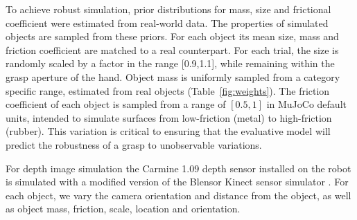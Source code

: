 To achieve robust simulation, prior distributions for mass, size and frictional coefficient were estimated from real-world data. The properties of simulated objects are sampled from these priors. For each object its mean size, mass and friction coefficient are matched to a real counterpart. For each trial, the size is randomly scaled by a factor in the range [0.9,1.1], while remaining within the grasp aperture of the hand. Object mass is uniformly sampled from a category specific range, estimated from real objects (Table~\ref{fig:weights}). The friction coefficient of each object is sampled from a range of $[0.5, 1]$ in MuJoCo default units, intended to simulate surfaces from low-friction (metal) to high-friction (rubber). This variation is critical to ensuring that the evaluative model will predict the robustness of a grasp to unobservable variations.
\begin{table}[]
\centering
\caption{Mass ranges for each object class (grams).}
\label{fig:weights}
\end{table}
 
For depth image simulation the Carmine 1.09 depth sensor installed on the robot is simulated with a modified version of the Blensor Kinect sensor simulator \cite{KinectSimulator}. For each object, we vary the camera orientation and distance from the object, as well as object mass, friction, scale, location and orientation. 

